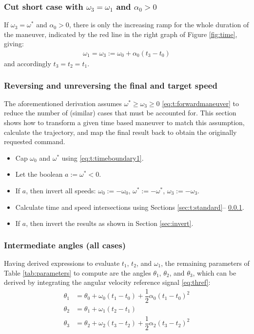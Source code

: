 \documentclass[12pt, a4paper]
{article}
\providecommand{\w}{\omega}
\providecommand{\wt}{\w^*}
\renewcommand{\th}{\theta}
\renewcommand{\a}{\alpha}
\begin{document}
\subsubsection{Cut short case with $\w_3 = \w_1$ and $\a_0 > 0$}
\label{sec:t:cutshortw3}

If $\w_3 = \wt$ and $\a_0 > 0$, there is only the increasing
ramp for the whole duration of the maneuver, indicated by the
red line in the right graph of Figure \ref{fig:time}, giving:
%
\begin{align}
    \w_1 = \w_3 := \w_0 + \a_0(t_3 - t_0)
\end{align}
%
and accordingly $t_3=t_2=t_1$.




\subsubsection{Reversing and unreversing the final and target speed}

\label{sec:t:reversing}
The aforementioned derivation assumes $\wt \geq \w_3 \geq 0$
\eqref{eq:t:forwardmaneuver} to reduce the number of (similar) cases that must
be accounted for. This section shows how to transform a given time based
maneuver to match this assumption, calculate the trajectory, and map the final
result back to obtain the originally requested command.

\begin{itemize}
    \item Cap $\w_0$ and $\wt$ using \eqref{eq:t:timeboundary1}.
    \item Let the boolean $a := \wt < 0$.
    \item If $a$, then invert all speeds: $\w_0 := -\w_0$, $\wt := -\wt$,
        $\w_3 := -\w_3$.
    \item Calculate time and speed intersections using Sections \ref{sec:t:standard}--
    \ref{sec:t:cutshortw3}.
    \item If $a$, then invert the results as shown in Section \ref{sec:invert}.
\end{itemize}


\subsubsection{Intermediate angles (all cases)}

Having derived expressions to evaluate $t_1$, $t_2$, and $\w_1$, the remaining
parameters of Table \ref{tab:parameters} to compute are the angles
$\th_1$, $\th_2$, and $\th_3$, which can be derived by integrating the
angular velocity reference signal \eqref{eq:thref}:
\begin{align}
    \label{eq:t:anglepar1}
    \th_1  &= \th_0  + \w_0(t_1-t_0)+\dfrac{1}{2}\a_0(t_1-t_0)^2\\
    \label{eq:t:anglepar2}
    \th_2&=\th_1+ \w_1(t_2-t_1)\\
    \label{eq:t:anglepar3}
    \th_3  &=\th_2+ \w_2(t_3-t_2)+\dfrac{1}{2}\a_2(t_3-t_2)^2    
\end{align}
%
\end{document}

